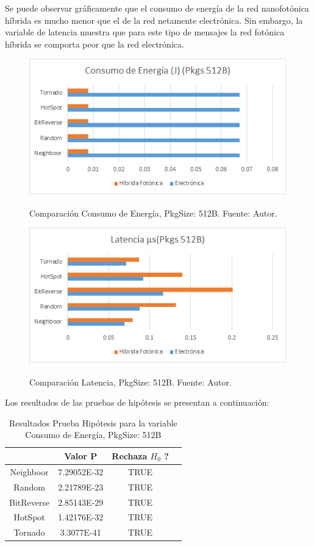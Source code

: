 Se puede observar gráficamente que el consumo de energía de la red
nanofotónica híbrida es mucho menor que el de la red netamente electrónica.
Sin embargo, la variable de latencia muestra que para este tipo de mensajes
la red fotónica híbrida se comporta peor que la red electrónica.

\begin{figure}[H]
\caption{Comparación Consumo de Energía, PkgSize: 512B. Fuente: Autor.}
\centering
\includegraphics[width=1.0\textwidth,natwidth=483,natheight=256]{figs/E512.png}
\label{fig:e512}
\end{figure} 

\begin{figure}[H]
\caption{Comparación Latencia, PkgSize: 512B. Fuente: Autor.}
\centering
\includegraphics[width=1.0\textwidth,natwidth=483,natheight=256]{figs/L512.png}
\label{fig:l512}
\end{figure} 

Los resultados de las pruebas de hipótesis se presentan a continuación:
 
\begin{table}[H]
\centering
\begin{tabular}{|c|c|c|c|}
\hline
&Valor P&Rechaza $H_0$ ?\\
\hline
Neighboor&7.29052E-32&TRUE\\
Random&2.21789E-23&TRUE\\
BitReverse&2.85143E-29&TRUE\\
HotSpot&1.42176E-32&TRUE\\
Tornado&3.3077E-41&TRUE\\
\hline
\end{tabular}
\caption{Resultados Prueba Hipótesis para la variable Consumo de Energía, PkgSize: 512B}
\label{tb:ettest512}
\end{table}


